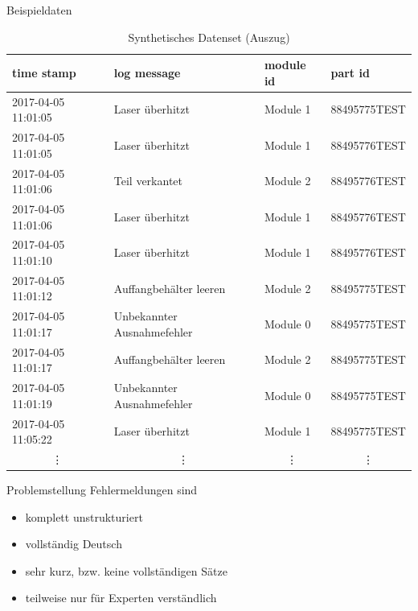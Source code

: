 \documentclass{beamer}
\begin{document}
  \begin{frame}{Beispieldaten}
\begin{table}[]
    \centering
    \caption{Synthetisches Datenset (Auszug)}
    \label{table:dummy_messages}
    \footnotesize 
    \begin{tabular}{l|l|l|l}
        time stamp & log message & module id & part id \\ \hline
        2017-04-05 11:01:05 & Laser überhitzt            & Module 1 & 88495775TEST \\
        2017-04-05 11:01:05 & Laser überhitzt            & Module 1 & 88495776TEST \\
        2017-04-05 11:01:06 & Teil verkantet             & Module 2 & 88495776TEST \\
        2017-04-05 11:01:06 & Laser überhitzt            & Module 1 & 88495776TEST \\
        2017-04-05 11:01:10 & Laser überhitzt            & Module 1 & 88495776TEST \\
        2017-04-05 11:01:12 & Auffangbehälter leeren     & Module 2 & 88495775TEST \\
        2017-04-05 11:01:17 & Unbekannter Ausnahmefehler & Module 0 & 88495775TEST \\
        2017-04-05 11:01:17 & Auffangbehälter leeren     & Module 2 & 88495775TEST \\
        2017-04-05 11:01:19 & Unbekannter Ausnahmefehler & Module 0 & 88495775TEST \\
        2017-04-05 11:05:22 & Laser überhitzt            & Module 1 & 88495775TEST \\
        \multicolumn{1}{c}{\vdots} & \multicolumn{1}{c}{\vdots} & \multicolumn{1}{c}{\vdots} & \multicolumn{1}{c}{\vdots}
    \end{tabular}
\end{table}
\end{frame}

\begin{frame}{Problemstellung}
Fehlermeldungen sind
\begin{itemize}
    \item komplett unstrukturiert
    \item vollständig Deutsch
    \item sehr kurz, bzw. keine vollständigen Sätze
    \item teilweise nur für Experten verständlich
\end{itemize}
\end{frame}
\end{document}
